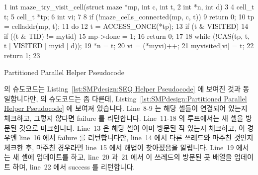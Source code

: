 \begin{listing}[tbp]
{ \scriptsize
\begin{verbbox}
  1 int maze_try_visit_cell(struct maze *mp, int c, int t,
  2       int *n, int d)
  3 {
  4   cell_t t;
  5   cell_t *tp;
  6   int vi;
  7 
  8   if (!maze_cells_connected(mp, c, t))
  9     return 0;
 10   tp = celladdr(mp, t);
 11   do {
 12     t = ACCESS_ONCE(*tp);
 13     if (t & VISITED) {
 14       if ((t & TID) != mytid)
 15         mp->done = 1;
 16       return 0;
 17     }
 18   } while (!CAS(tp, t, t | VISITED | myid | d));
 19   *n = t;
 20   vi = (*myvi)++;
 21   myvisited[vi] = t;
 22   return 1;
 23 }
\end{verbbox}
}
\centering
\theverbbox
\caption{Partitioned Parallel Helper Pseudocode}
\label{lst:SMPdesign:Partitioned Parallel Helper Pseudocode}
\end{listing}

 의 슈도코드는
Listing~\ref{lst:SMPdesign:SEQ Helper Pseudocode} 에 보여진 것과 동일합니다만,
 의 슈도코드는 좀 다른데,
Listing~\ref{lst:SMPdesign:Partitioned Parallel Helper Pseudocode} 에 보여져
있습니다.
Line~8-9 는 해당 셀들이 연결되어 있는지 체크하고, 그렇지 않다면 failure 를
리턴합니다.
Line~11-18 의 루프에서는 새 셀을 방문된 것으로 마크합니다.
Line~13 은 해당 셀이 이미 방문된 적 있는지 체크하고, 이 경우엔 line~16 에서
failure 를 리턴합니다만, line~14 에서 다른 쓰레드와 마주친 것인지 체크한 후,
마주친 경우라면 line~15 에서 해법이 찾아졌음을 알립니다.
Line~19 에서는 새 셀에 업데이트를 하고, line~20 과~21 에서 이 쓰레드의 방문된
곳 배열을 업데이트 하며, line~22 에서 success 를 리턴합니다.

